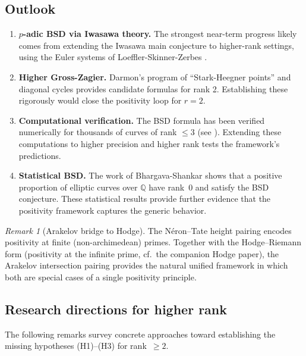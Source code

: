 \documentclass[aps,prd,twocolumn,superscriptaddress,nofootinbib]{revtex4-2}
\theoremstyle{definition}
\theoremstyle{remark}
\newtheorem{remark}[theorem]{Remark}
\begin{document}
\subsection{Outlook}

\begin{enumerate}
\item \textbf{$p$-adic BSD via Iwasawa theory.} The strongest near-term progress likely comes from extending the Iwasawa main conjecture to higher-rank settings, using the Euler systems of Loeffler-Skinner-Zerbes \cite{LSZ2020}.

\item \textbf{Higher Gross-Zagier.} Darmon's program of ``Stark-Heegner points'' and diagonal cycles provides candidate formulas for rank 2. Establishing these rigorously would close the positivity loop for $r = 2$.

\item \textbf{Computational verification.} The BSD formula has been verified numerically for thousands of curves of rank $\leq 3$ (see \cite{LMFDB}). Extending these computations to higher precision and higher rank tests the framework's predictions.

\item \textbf{Statistical BSD.} The work of Bhargava-Shankar \cite{BhargavaShankar2015} shows that a positive proportion of elliptic curves over $\mathbb{Q}$ have rank~0 and satisfy the BSD conjecture. These statistical results provide further evidence that the positivity framework captures the generic behavior.
\end{enumerate}


\begin{remark}[Arakelov bridge to Hodge]
\label{rem:arakelov-bridge}
The N\'eron--Tate height pairing encodes positivity at finite (non-archimedean) primes. Together with the Hodge--Riemann form (positivity at the infinite prime, cf.\ the companion Hodge paper), the Arakelov intersection pairing provides the natural unified framework in which both are special cases of a single positivity principle.
\end{remark}


\subsection{Research directions for higher rank}
\label{sec:higher_rank_directions}

The following remarks survey concrete approaches toward establishing the missing hypotheses (H1)--(H3) for rank~$\geq 2$.
\end{document}
